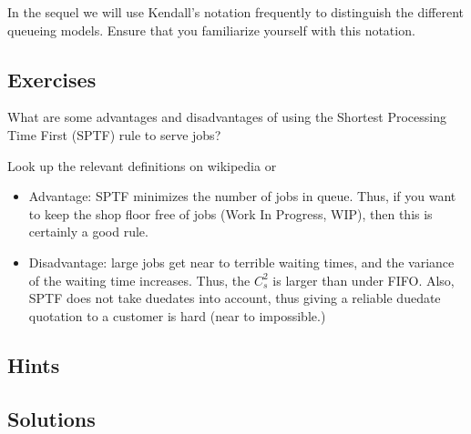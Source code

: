 In the sequel we will use Kendall's notation frequently to distinguish
the different queueing models. Ensure that you familiarize yourself
with this notation.


\subsection*{Exercises}
\begin{question}
  What are some advantages and disadvantages of using the Shortest
  Processing Time First (SPTF) rule to serve jobs? 
  \begin{hint}
Look up the relevant
  definitions on wikipedia or
  \citet{hall91:_queuein_method_servic_manuf}
  \end{hint}

  \begin{solution}
  \begin{itemize}
  \item Advantage: SPTF minimizes the number of jobs in queue. Thus,
    if you want to keep the shop floor free of jobs (Work In Progress,
    WIP), then this is certainly a good rule. 
  \item Disadvantage: large jobs get near to terrible waiting times,
    and the variance of the waiting time increases. Thus, the $C_s^2$
    is larger than under FIFO. Also, SPTF does not take duedates into
    account, thus giving a reliable duedate quotation to a customer is
    hard (near to impossible.)
  \end{itemize}
  \end{solution}
\end{question}


\subsection*{Hints}

\subsection*{Solutions}

\clearpage

